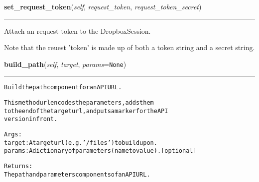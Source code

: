 \hspace{.8\funcindent}\begin{boxedminipage}{\funcwidth}

    \raggedright \textbf{set\_request\_token}(\textit{self}, \textit{request\_token}, \textit{request\_token\_secret})

    \vspace{-1.5ex}

    \rule{\textwidth}{0.5\fboxrule}
\setlength{\parskip}{2ex}
    Attach an request token to the DropboxSession.

    Note that the reuest 'token' is made up of both a token string and a 
    secret string.

\setlength{\parskip}{1ex}
    \end{boxedminipage}

    \label{lib:dropbox:DropboxSession:build_path}

    \vspace{0.5ex}

\hspace{.8\funcindent}\begin{boxedminipage}{\funcwidth}

    \raggedright \textbf{build\_path}(\textit{self}, \textit{target}, \textit{params}={\tt None})

    \vspace{-1.5ex}

    \rule{\textwidth}{0.5\fboxrule}
\setlength{\parskip}{2ex}
\begin{alltt}
Build the path component for an API URL.

This method urlencodes the parameters, adds them
to the end of the target url, and puts a marker for the API
version in front.

Args:
    target: A target url (e.g. '/files') to build upon.
    params: A dictionary of parameters (name to value). [optional]

Returns:
    The path and parameters components of an API URL.
\end{alltt}

\setlength{\parskip}{1ex}
    \end{boxedminipage}

    \label{lib:dropbox:DropboxSession:build_url}

